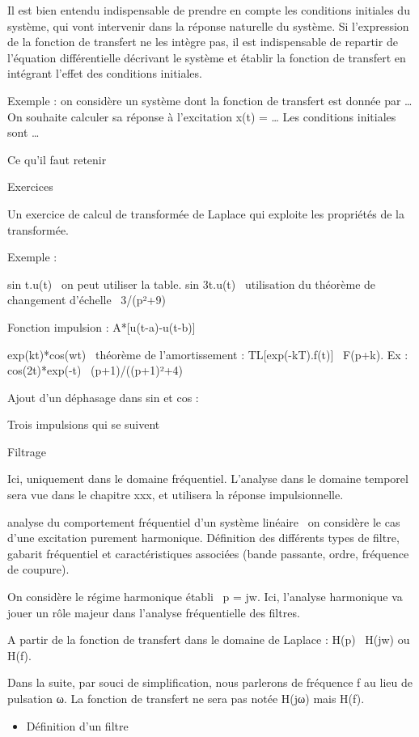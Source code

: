 \documentclass[]{article}
\begin{document}
Il est bien entendu indispensable de prendre en compte les conditions
initiales du système, qui vont intervenir dans la réponse naturelle du
système. Si l'expression de la fonction de transfert ne les intègre pas,
il est indispensable de repartir de l'équation différentielle décrivant
le système et établir la fonction de transfert en intégrant l'effet des
conditions initiales.

Exemple : on considère un système dont la fonction de transfert est
donnée par \ldots{} On souhaite calculer sa réponse à l'excitation x(t)
= \ldots{} Les conditions initiales sont \ldots{}

Ce qu'il faut retenir

Exercices

Un exercice de calcul de transformée de Laplace qui exploite les
propriétés de la transformée.

Exemple :

sin t.u(t)~ on peut utiliser la table. sin 3t.u(t)~ utilisation du
théorème de changement d'échelle~ 3/(p²+9)

Fonction impulsion : A*{[}u(t-a)-u(t-b){]}

exp(kt)*cos(wt)~ théorème de l'amortissement : TL{[}exp(-kT).f(t){]}~
F(p+k). Ex : cos(2t)*exp(-t)~ (p+1)/((p+1)²+4)

Ajout d'un déphasage dans sin et cos :

Trois impulsions qui se suivent

Filtrage

Ici, uniquement dans le domaine fréquentiel. L'analyse dans le domaine
temporel sera vue dans le chapitre xxx, et utilisera la réponse
impulsionnelle.

analyse du comportement fréquentiel d'un système linéaire~ on considère
le cas d'une excitation purement harmonique. Définition des différents
types de filtre, gabarit fréquentiel et caractéristiques associées
(bande passante, ordre, fréquence de coupure).

On considère le régime harmonique établi~ p = jw. Ici, l'analyse
harmonique va jouer un rôle majeur dans l'analyse fréquentielle des
filtres.

A partir de la fonction de transfert dans le domaine de Laplace : H(p)~
H(jw) ou H(f).

Dans la suite, par souci de simplification, nous parlerons de fréquence
f au lieu de pulsation ω. La fonction de transfert ne sera pas notée
H(jω) mais H(f).

\begin{itemize}
\itemsep1pt\parskip0pt
\item
  Définition d'un filtre
\end{itemize}
\end{document}
